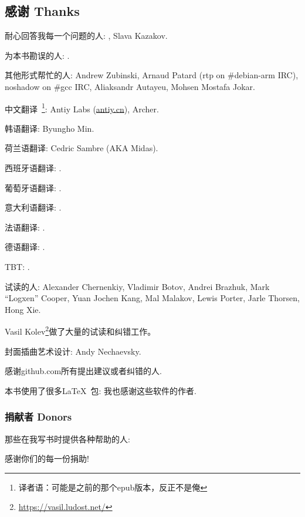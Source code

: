 \documentclass[UTF8,nofonts]{ctexart}
\begin{document}

\subsection*{感谢 Thanks}

耐心回答我每一个问题的人: \HERMIT, Slava  Kazakov.

为本书勘误的人: \PeopleMistakesInaccuracies{}.

其他形式帮忙的人:
Andrew Zubinski,
Arnaud Patard (rtp on \#debian-arm IRC),
noshadow on \#gcc IRC,
Aliaksandr Autayeu,
Mohsen Mostafa Jokar.

中文翻译~\footnote{译者语：可能是之前的那个epub版本，反正不是俺}:
Antiy Labs (\href{http://antiy.cn}{antiy.cn}), Archer.

韩语翻译: Byungho Min.

荷兰语翻译: Cedric Sambre (AKA Midas).

西班牙语翻译: \PeopleSpanishTranslators{}.

葡萄牙语翻译: \PeoplePTBRTranslators{}.

意大利语翻译: \PeopleItalianTranslators{}.

法语翻译: \PeopleFrenchTranslators{}.

德语翻译: \PeopleGermanTranslators{}.

\ac{TBT}: \PeoplePolishTranslators{}.

试读的人:
Alexander  Chernenkiy,
Vladimir Botov,
Andrei Brazhuk,
Mark ``Logxen'' Cooper, Yuan Jochen Kang, Mal Malakov, Lewis Porter, Jarle Thorsen, Hong Xie.

Vasil Kolev\footnote{\url{https://vasil.ludost.net/}}做了大量的试读和纠错工作。

封面插曲艺术设计: Andy Nechaevsky.

感谢github.com所有提出建议或者纠错的人\FNGithubContributors{}.

本书使用了很多\LaTeX\ 包: 我也感谢这些软件的作者.

\subsubsection*{捐献者 Donors}

那些在我写书时提供各种帮助的人:



感谢你们的每一份捐助!
\end{document}
